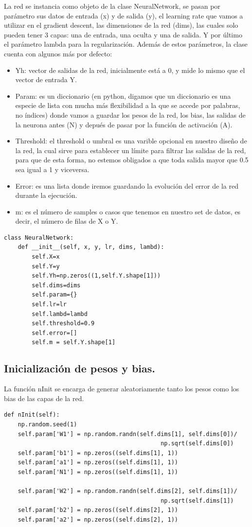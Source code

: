 \documentclass[a4paper,10pt]{article}
\begin{document}
La red se instancia como objeto de la clase NeuralNetwork, se pasan por parámetro sus datos de entrada (x) y de salida (y), el learning rate que vamos a utilizar en el gradient descent, las dimensiones de la red (dims), las cuales solo pueden tener 3 capas: una de entrada, una oculta y una de salida. Y por último el parámetro lambda para la regularización. Además de estos parámetros, la clase cuenta con algunos más por defecto:
\begin{itemize}
    \item Yh: vector de salidas de la red, inicialmente está a 0, y mide lo mismo que el vector de entrada Y.
    \item Param: es un diccionario (en python, digamos que un diccionario es una especie de lista con mucha más flexibilidad a la que se accede por palabras, no índices) donde vamos a guardar los pesos de la red, los bias, las salidas de la neurona antes (N) y depués de pasar por la función de activación (A).
    \item Threshold: el threshold o umbral es una varible opcional en nuestro diseño de la red, la cual sirve para establecer un límite para filtrar las salidas de la red, para que de esta forma, no estemos obligados a que toda salida mayor que 0.5 sea igual a 1 y viceversa.
    \item Error: es una lista donde iremos guardando la evolución del error de la red durante la ejecución.
    \item m: es el número de samples o casos que tenemos en nuestro set de datos, es decir, el número de filas de X o Y.
\end{itemize}
\begin{lstlisting}
class NeuralNetwork:
    def __init__(self, x, y, lr, dims, lambd):
        self.X=x
        self.Y=y
        self.Yh=np.zeros((1,self.Y.shape[1]))
        self.dims=dims
        self.param={}
        self.lr=lr
        self.lambd=lambd
        self.threshold=0.9
        self.error=[]
        self.m = self.Y.shape[1]
\end{lstlisting}
\subsection{Inicialización de pesos y bias.}

La función nInit se encarga de generar aleatoriamente tanto los pesos como los bias de las capas de la red.
\begin{lstlisting}
def nInit(self): 
    np.random.seed(1)
    self.param['W1'] = np.random.randn(self.dims[1], self.dims[0])/ 
                                             np.sqrt(self.dims[0]) 
    self.param['b1'] = np.zeros((self.dims[1], 1))   
    self.param['a1'] = np.zeros((self.dims[1], 1))        
    self.param['N1'] = np.zeros((self.dims[1], 1))             
     
    self.param['W2'] = np.random.randn(self.dims[2], self.dims[1])/ 
                                             np.sqrt(self.dims[1]) 
    self.param['b2'] = np.zeros((self.dims[2], 1))     
    self.param['a2'] = np.zeros((self.dims[2], 1))   
      
\end{lstlisting}
\end{document}
